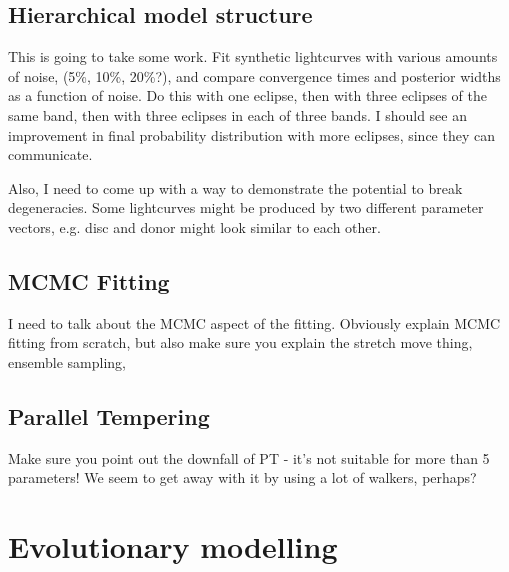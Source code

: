 \subsection{Hierarchical model structure}
This is going to take some work. Fit synthetic lightcurves with various amounts of noise, (5\%, 10\%, 20\%?), and compare convergence times and posterior widths as a function of noise. Do this with one eclipse, then with three eclipses of the same band, then with three eclipses in each of three bands.
I should see an improvement in final probability distribution with more eclipses, since they can communicate.

Also, I need to come up with a way to demonstrate the potential to break degeneracies. Some lightcurves might be produced by two different parameter vectors, e.g. disc and donor might look similar to each other. 

\subsection{MCMC Fitting}
I need to talk about the MCMC aspect of the fitting. Obviously explain MCMC fitting from scratch, but also make sure you explain the stretch move thing, ensemble sampling, 

\subsection{Parallel Tempering}
Make sure you point out the downfall of PT - it's not suitable for more than 5 parameters! We seem to get away with it by using a lot of walkers, perhaps?


\section{Evolutionary modelling}
\label{sect:method:evolutionary modelling}